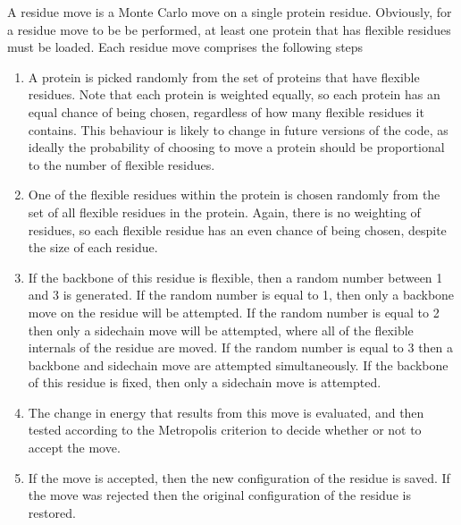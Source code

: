 \documentclass[letterpaper,10pt,english]{sphinxmanual}
\begin{document}
\ignorespaces 
{}
A residue move is a Monte Carlo move on a single protein residue. Obviously, for a residue move to be be performed, at least one protein that has flexible residues must be loaded. Each residue move comprises the following steps
\begin{enumerate}
\item {} 
A protein is picked randomly from the set of proteins that have flexible residues. Note that each protein is weighted equally, so each protein has an equal chance of being chosen, regardless of how many flexible residues it contains. This behaviour is likely to change in future versions of the code, as ideally the probability of choosing to move a protein should be proportional to the number of flexible residues.

\item {} 
One of the flexible residues within the protein is chosen randomly from the set of all flexible residues in the protein. Again, there is no weighting of residues, so each flexible residue has an even chance of being chosen, despite the size of each residue.

\item {} 
If the backbone of this residue is flexible, then a random number between 1 and 3 is generated. If the random number is equal to 1, then only a backbone move on the residue will be attempted. If the random number is equal to 2 then only a sidechain move will be attempted, where all of the flexible internals of the residue are moved. If the random number is equal to 3 then a backbone and sidechain move are attempted simultaneously. If the backbone of this residue is fixed, then only a sidechain move is attempted.

\item {} 
The change in energy that results from this move is evaluated, and then tested according to the Metropolis criterion to decide whether or not to accept the move.

\item {} 
If the move is accepted, then the new configuration of the residue is saved. If the move was rejected then the original configuration of the residue is restored.

\end{enumerate}
\end{document}
